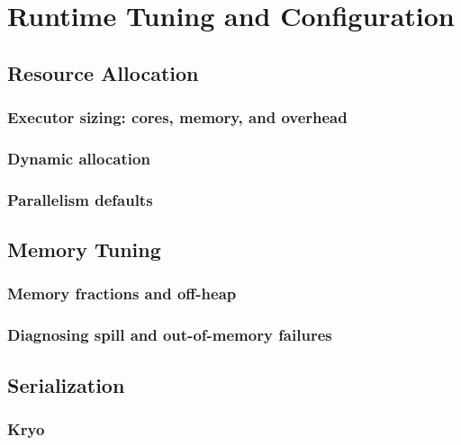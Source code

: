 \chapter{Runtime Tuning and Configuration}
\label{ch:tuning}

\tbd


\section{Resource Allocation}
\label{sec:tune-resources}

\subsection{Executor sizing: cores, memory, and overhead}
\tbd

\subsection{Dynamic allocation}
\tbd

\subsection{Parallelism defaults}
\tbd

\section{Memory Tuning}
\label{sec:tune-memory}

\subsection{Memory fractions and off-heap}
\tbd

\subsection{Diagnosing spill and out-of-memory failures}
\tbd

\section{Serialization}
\label{sec:tune-serialization}

\subsection{Kryo}
\tbd

